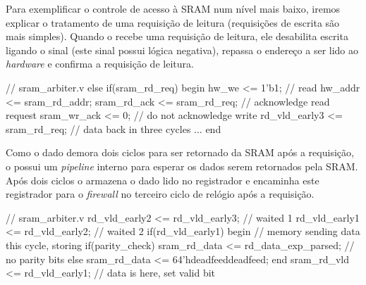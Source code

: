 
Para exemplificar o controle de acesso à SRAM num nível mais baixo,
iremos explicar o tratamento de uma requisição de leitura (requisições
de escrita são mais simples).  Quando o  recebe uma
requisição de leitura, ele desabilita escrita ligando o sinal
 (este sinal possui lógica negativa), repassa o endereço a
ser lido ao \emph{hardware} e confirma a requisição de leitura.

\begin{verilogcode}
   // sram_arbiter.v
   else if(sram_rd_req) begin
      hw_we <= 1'b1;                // read
      hw_addr <= sram_rd_addr;
      sram_rd_ack <= sram_rd_req;   // acknowledge read request
      sram_wr_ack <= 0;             // do not acknowledge write
      rd_vld_early3 <= sram_rd_req; // data back in three cycles
      ...
   end
\end{verilogcode}

Como o dado demora dois ciclos para ser retornado da SRAM após a
requisição, o  possui um \emph{pipeline} interno para
esperar os dados serem retornados pela SRAM.  Após dois ciclos o
 armazena o dado lido no registrador
 e encaminha este registrador para o \emph{firewall}
no terceiro ciclo de relógio após a requisição.

\begin{verilogcode}
   // sram_arbiter.v
   rd_vld_early2 <= rd_vld_early3; // waited 1
   rd_vld_early1 <= rd_vld_early2; // waited 2
   if(rd_vld_early1) begin // memory sending data this cycle, storing
      if(parity_check)
         sram_rd_data <= rd_data_exp_parsed; // no parity bits
      else
         sram_rd_data <= 64'hdeadfeeddeadfeed;
   end
   sram_rd_vld <= rd_vld_early1;   // data is here, set valid bit
\end{verilogcode}
